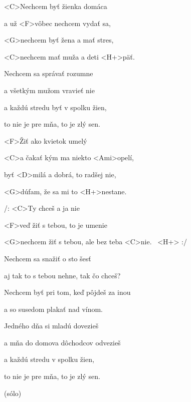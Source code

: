 

\zs
<C>Nechcem byť žienka domáca

a už <F>vôbec nechcem vydať sa,

<G>nechcem byť žena a mať stres,

<C>nechcem mať muža a deti <H+>päť.
\ks

\zs
Nechcem sa správať rozumne

a všetkým mužom vravieť nie

a každú stredu byť v spolku žien,

to nie je pre mňa, to je zlý sen.
\ks

\zr
<F>Žiť ako kvietok umelý

<C>a čakať kým ma niekto <Ami>opelí,

byť <D>milá a dobrá, to radšej nie,

<G>dúfam, že sa mi to <H+>nestane.

/: <C>Ty chceš a ja nie

<F>veď žiť s tebou, to je umenie

<G>nechcem žiť s tebou, ale bez teba <C>nie. ~<H+> :/
\kr

\zs
Nechcem sa snažiť o sto šesť

aj tak to s tebou nehne, tak čo chceš?

Nechcem byť pri tom, keď pôjdeš za inou

a so susedom plakať nad vínom.
\ks

\zs
Jedného dňa si mladú dovezieš

a mňa do domova dôchodcov odvezieš

a každú stredu v spolku žien,

to nie je pre mňa, to je zlý sen.
\ks

\zr \kr
(sólo)
\zr \kr
\kp
